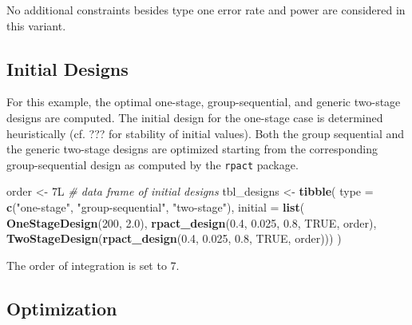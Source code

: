 \documentclass[]{book}
\newenvironment{Shaded}{\begin{snugshade}}{\end{snugshade}}
\newcommand{\CommentTok}[1]{\textcolor[rgb]{0.56,0.35,0.01}{\textit{#1}}}
\newcommand{\DataTypeTok}[1]{\textcolor[rgb]{0.13,0.29,0.53}{#1}}
\newcommand{\DecValTok}[1]{\textcolor[rgb]{0.00,0.00,0.81}{#1}}
\newcommand{\FloatTok}[1]{\textcolor[rgb]{0.00,0.00,0.81}{#1}}
\newcommand{\KeywordTok}[1]{\textcolor[rgb]{0.13,0.29,0.53}{\textbf{#1}}}
\newcommand{\NormalTok}[1]{#1}
\newcommand{\OperatorTok}[1]{\textcolor[rgb]{0.81,0.36,0.00}{\textbf{#1}}}
\newcommand{\OtherTok}[1]{\textcolor[rgb]{0.56,0.35,0.01}{#1}}
\newcommand{\StringTok}[1]{\textcolor[rgb]{0.31,0.60,0.02}{#1}}
\begin{document}
No additional constraints besides type one error rate and power
are considered in this variant.

\hypertarget{initial-designs}{%
\subsection{Initial Designs}\label{initial-designs}}

For this example, the optimal one-stage, group-sequential, and generic
two-stage designs are computed.
The initial design for the one-stage case is determined heuristically
(cf. ??? for stability of initial values).
Both the group sequential and the generic two-stage designs are
optimized starting from the corresponding group-sequential design as
computed by the \texttt{rpact} package.

\begin{Shaded}
\begin{Highlighting}[]
\NormalTok{order <-}\StringTok{ }\NormalTok{7L}
\CommentTok{# data frame of initial designs }
\NormalTok{tbl_designs <-}\StringTok{ }\KeywordTok{tibble}\NormalTok{(}
    \DataTypeTok{type    =} \KeywordTok{c}\NormalTok{(}\StringTok{"one-stage"}\NormalTok{, }\StringTok{"group-sequential"}\NormalTok{, }\StringTok{"two-stage"}\NormalTok{),}
    \DataTypeTok{initial =} \KeywordTok{list}\NormalTok{(}
        \KeywordTok{OneStageDesign}\NormalTok{(}\DecValTok{200}\NormalTok{, }\FloatTok{2.0}\NormalTok{),}
        \KeywordTok{rpact_design}\NormalTok{(}\FloatTok{0.4}\NormalTok{, }\FloatTok{0.025}\NormalTok{, }\FloatTok{0.8}\NormalTok{, }\OtherTok{TRUE}\NormalTok{, order),}
        \KeywordTok{TwoStageDesign}\NormalTok{(}\KeywordTok{rpact_design}\NormalTok{(}\FloatTok{0.4}\NormalTok{, }\FloatTok{0.025}\NormalTok{, }\FloatTok{0.8}\NormalTok{, }\OtherTok{TRUE}\NormalTok{, order))) )}
\end{Highlighting}
\end{Shaded}

The order of integration is set to 7.

\hypertarget{optimization}{%
\subsection{Optimization}\label{optimization}}

\begin{Shaded}
\end{Shaded}
\end{document}
